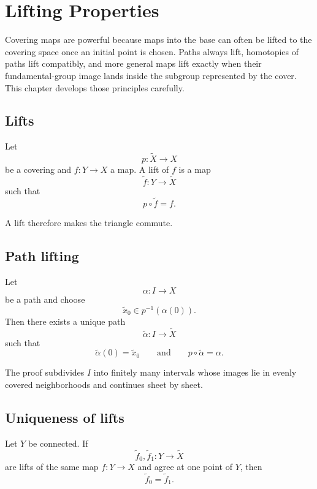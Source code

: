 ﻿\chapter{Lifting Properties}
\label{ch:viii11-lifting-properties}

Covering maps are powerful because maps into the base can often be lifted to
the covering space once an initial point is chosen.  Paths always lift,
homotopies of paths lift compatibly, and more general maps lift exactly when
their fundamental-group image lands inside the subgroup represented by the
cover.  This chapter develops those principles carefully.

\section{Lifts}

\begin{definition}[Lift]
\label{def:viii11-lift}
Let
\[
p:\widetilde X\to X
\]
be a covering and \(f:Y\to X\) a map.  A lift of \(f\) is a map
\[
\widetilde f:Y\to\widetilde X
\]
such that
\[
p\circ\widetilde f=f.
\]
\end{definition}

A lift therefore makes the triangle commute.

\section{Path lifting}

\begin{theorem}
\label{thm:viii11-path-lifting}
Let
\[
\alpha:I\to X
\]
be a path and choose
\[
\tilde x_0\in p^{-1}(\alpha(0)).
\]
Then there exists a unique path
\[
\widetilde\alpha:I\to\widetilde X
\]
such that
\[
\widetilde\alpha(0)=\tilde x_0
\qquad\text{and}\qquad
p\circ\widetilde\alpha=\alpha.
\]
\end{theorem}

The proof subdivides \(I\) into finitely many intervals whose images lie in
evenly covered neighborhoods and continues sheet by sheet.

\section{Uniqueness of lifts}

\begin{theorem}
\label{thm:viii11-unique-lifts}
Let \(Y\) be connected.  If
\[
\widetilde f_0,\widetilde f_1:Y\to\widetilde X
\]
are lifts of the same map \(f:Y\to X\) and agree at one point of \(Y\), then
\[
\widetilde f_0=\widetilde f_1.
\]
\end{theorem}

